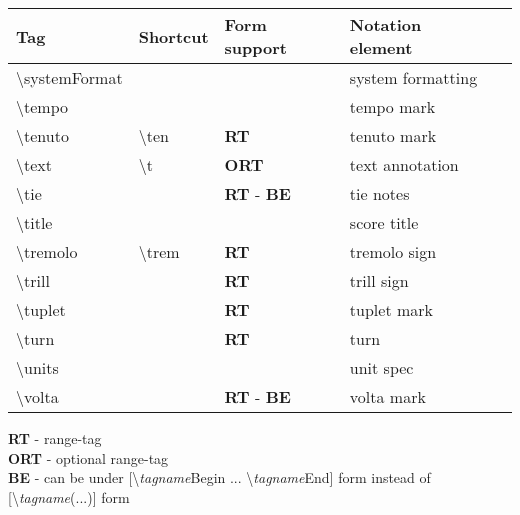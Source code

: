 \documentclass[a4paper, landscape, 11pt]{article}
\begin{document}
\begin{tabularx}{\linewidth}{p{3cm}p{5cm}lll}
    \hline
    \textbf{Tag}&\textbf{Shortcut}&\textbf{Form support}&\textbf{Notation element}&\textbf{ %
    }\\
    \hline
    \textbackslash{}systemFormat&&&system formatting&\\ %
    \hline
    \textbackslash{}tempo&&&tempo mark&\\
    \hline
    \textbackslash{}tenuto&\textbackslash{}ten&\textbf{RT}&tenuto mark&\\ %
    \hline
    \textbackslash{}text&\textbackslash{}t&\textbf{ORT}&text annotation&\\
    \hline
    \textbackslash{}tie&&\textbf{RT} - \textbf{BE}&tie notes&\\
    \hline
    \textbackslash{}title&&&score title&\\
    \hline
    \textbackslash{}tremolo&\textbackslash{}trem&\textbf{RT}&tremolo sign&\\
    \hline
    \textbackslash{}trill&&\textbf{RT}&trill sign&\\
    \hline
    \textbackslash{}tuplet&&\textbf{RT}&tuplet mark&\\
    \hline
    \textbackslash{}turn&&\textbf{RT}&turn&\\
    \hline
    \textbackslash{}units&&&unit spec&\\
    \hline
    \textbackslash{}volta&&\textbf{RT} - \textbf{BE}&volta mark&\\
    \hline
\end{tabularx}

\bigskip

\textbf{RT} - range-tag \\
\textbf{ORT} - optional range-tag \\
\textbf{BE} - can be under [\textbackslash{}\emph{tagname}Begin ... \textbackslash{}\emph{tagname}End] form instead of [\textbackslash{}\emph{tagname}(...)] form
\end{document}
